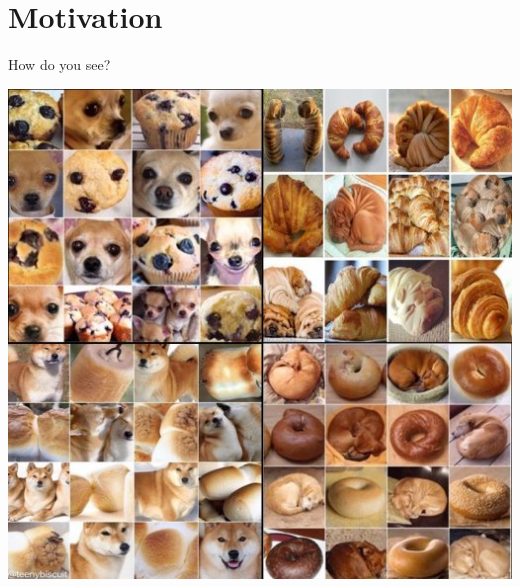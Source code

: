 \documentclass[serif, aspectratio=169]{beamer}
\begin{document}
	\section{Motivation}
	\begin{frame}{How do you see?}
		
		\begin{center}
			\includegraphics[keepaspectratio, scale=0.334]{pic/how.png}

\end{center}
\end{frame}
\end{document}
